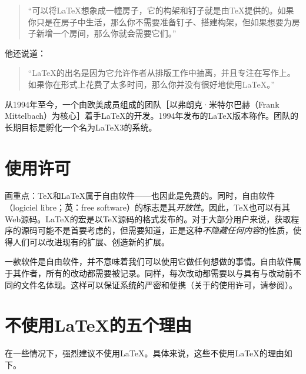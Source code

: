 \begin{quote}
    “可以将\LaTeX 想象成一幢房子，它的构架和钉子就是由\TeX 提供的。如果你只是在房子中生活，那么你不需要准备钉子、搭建构架，但如果想要为房子新增一个房间，那么你就会需要它们。”
\end{quote}

他还说道：

\begin{quote}
    “\LaTeX 的出名是因为它允许作者从排版工作中抽离，并且专注在写作上。如果你在形式上花费了太多时间，那么你并没有很好地使用\LaTeX 。”
\end{quote}

从1994年至今，一个由欧美成员组成的团队［以弗朗克·米特尔巴赫（Frank Mittelbach）为核心］着手\LaTeX 的开发。1994年发布的\LaTeX 版本称作\LaTeXe。团队的长期目标是孵化一个名为\LaTeX 3的系统。

\section*{使用许可}

画重点：\TeX 和\LaTeX 属于自由软件——也因此是免费的。同时，自由软件（logiciel libre；英：free software）的标志是其\textit{开放性}。因此，\TeX 也可以有其Web源码。\LaTeX 的宏是以\TeX 源码的格式发布的。对于大部分用户来说，获取程序的源码可能不是首要考虑的，但需要知道，正是这种\textit{不隐藏任何内容}的性质，使得人们可以改进现有的扩展、创造新的扩展。

一款软件是自由软件，并不意味着我们可以使用它做任何想做的事情。自由软件属于其作者，所有的改动都需要被记录。同样，每次改动都需要以与具有与改动前不同的文件名体现。这样可以保证系统的严密和便携（关于\LaTeXe 的使用许可，请参阅）。

\section*{不使用\LaTeX 的五个理由}

在一些情况下，强烈建议不使用\LaTeX 。具体来说，这些不使用\LaTeX 的理由如下。

